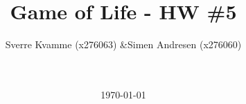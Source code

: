 



\title{Game of Life - HW \#5}
\author{Sverre Kvamme (x276063) \&Simen Andresen (x276060)}
\date{\ \\ \ \\ \today}




\maketitle


\pagestyle{fancy}
\lhead{}
\rhead{\thepage}
\setcounter{page}{1}

\rhead{\thepage}
\cfoot{}


%



